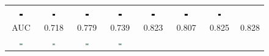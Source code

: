 \documentclass[10pt,twocolumn,letterpaper]{article}
\begin{document}
\begin{figure} [tb]
\begin{tabular*}{\textwidth}{cccccccc}
 \includegraphics[width=0.12\textwidth]{fig/ed/119082[2-Bicubic]_cbd.jpg} &
 \includegraphics[width=0.12\textwidth]{fig/ed/119082[3-Zeyde]_cbd.jpg} &
 \includegraphics[width=0.12\textwidth]{fig/ed/119082[4-ANR]_cbd.jpg} &
 \includegraphics[width=0.12\textwidth]{fig/ed/119082[5-SRCNN]_cbd.jpg} &
 \includegraphics[width=0.12\textwidth]{fig/ed/119082[6-A+]_cbd.jpg} &
 \includegraphics[width=0.12\textwidth]{fig/ed/119082[7-JOR]_cbd.jpg} &
 \includegraphics[width=0.12\textwidth]{fig/ed/119082[8-SRF]_cbd.jpg} \\
    AUC & 0.718 & 0.779 & 0.739 & 0.823 & 0.807 & 0.825 & 0.828 \\
 \includegraphics[width=0.12\textwidth]{fig/ed/42049[1-Original].jpg} &
 \includegraphics[width=0.12\textwidth]{fig/ed/42049[2-Bicubic].jpg} &
 \includegraphics[width=0.12\textwidth]{fig/ed/42049[3-Zeyde].jpg} &
    \includegraphics[width=0.12\textwidth]{fig/ed/42049[4-ANR].jpg} &

\end{tabular*}
\end{figure}
\end{document}
